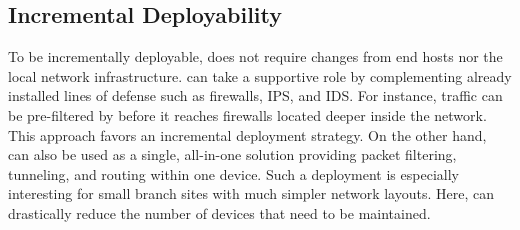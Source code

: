 









\subsection{Incremental Deployability}
\label{ssec:deployability}

To be incrementally deployable, \name does not require changes from end hosts nor the local network infrastructure. \name can take a supportive role by complementing already installed lines of defense such as firewalls, IPS, and IDS. For instance, traffic can be pre-filtered by \tps before it reaches firewalls located deeper inside the network. This approach favors an incremental deployment strategy. On the other hand, \name can also be used as a single, all-in-one solution providing packet filtering, tunneling, and routing within one device. Such a deployment is especially interesting for small branch sites with much simpler network layouts. Here, \name can drastically reduce the number of devices that need to be maintained.



